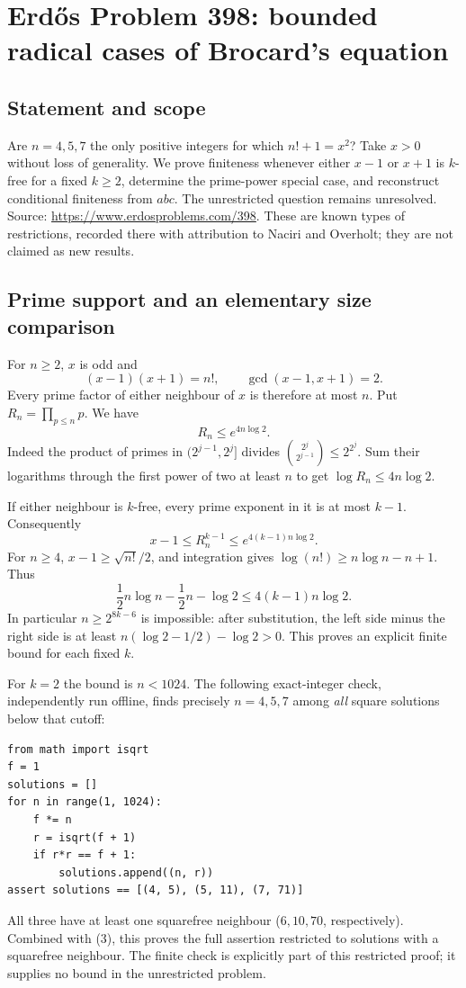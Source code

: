 \section*{Erd\H{o}s Problem 398: bounded radical cases of Brocard's equation}
\subsection*{Statement and scope}
Are $n=4,5,7$ the only positive integers for which $n!+1=x^2$? Take $x>0$ without loss of generality. We prove finiteness whenever either $x-1$ or $x+1$ is $k$-free for a fixed $k\ge2$, determine the prime-power special case, and reconstruct conditional finiteness from $abc$. The unrestricted question remains unresolved. Source: \url{https://www.erdosproblems.com/398}. These are known types of restrictions, recorded there with attribution to Naciri and Overholt; they are not claimed as new results.

\subsection*{Prime support and an elementary size comparison}
For $n\ge2$, $x$ is odd and
\[
 (x-1)(x+1)=n!,\qquad \gcd(x-1,x+1)=2. \tag{1}
\]
Every prime factor of either neighbour of $x$ is therefore at most $n$. Put $R_n=\prod_{p\le n}p$. We have
\[
 R_n\le e^{4n\log2}. \tag{2}
\]
Indeed the product of primes in $(2^{j-1},2^j]$ divides $\binom{2^j}{2^{j-1}}\le2^{2^j}$. Sum their logarithms through the first power of two at least $n$ to get $\log R_n\le4n\log2$.

If either neighbour is $k$-free, every prime exponent in it is at most $k-1$. Consequently
\[
 x-1\le R_n^{k-1}\le e^{4(k-1)n\log2}.
\]
For $n\ge4$, $x-1\ge\sqrt{n!}/2$, and integration gives $\log(n!)\ge n\log n-n+1$. Thus
\[
 \frac12n\log n-\frac12n-\log2
 \le4(k-1)n\log2. \tag{3}
\]
In particular $n\ge2^{8k-6}$ is impossible: after substitution, the left side minus the right side is at least $n(\log2-1/2)-\log2>0$. This proves an explicit finite bound for each fixed $k$.

For $k=2$ the bound is $n<1024$. The following exact-integer check, independently run offline, finds precisely $n=4,5,7$ among \emph{all} square solutions below that cutoff:
\begin{verbatim}
from math import isqrt
f = 1
solutions = []
for n in range(1, 1024):
    f *= n
    r = isqrt(f + 1)
    if r*r == f + 1:
        solutions.append((n, r))
assert solutions == [(4, 5), (5, 11), (7, 71)]
\end{verbatim}
All three have at least one squarefree neighbour ($6,10,70$, respectively). Combined with (3), this proves the full assertion restricted to solutions with a squarefree neighbour. The finite check is explicitly part of this restricted proof; it supplies no bound in the unrestricted problem.

